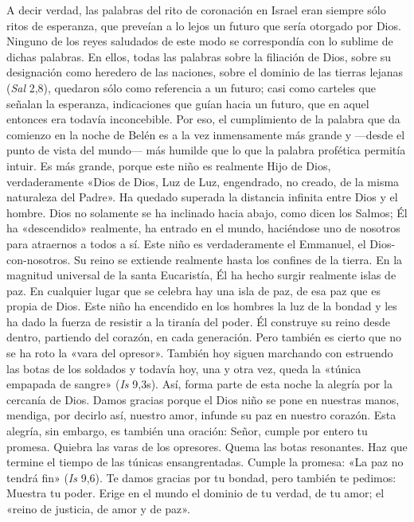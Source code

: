 \documentclass[]{article}
\begin{document}
A decir verdad, las palabras del rito de coronación en Israel eran
siempre sólo ritos de esperanza, que preveían a lo lejos un futuro que
sería otorgado por Dios. Ninguno de los reyes saludados de este modo se
correspondía con lo sublime de dichas palabras. En ellos, todas las
palabras sobre la filiación de Dios, sobre su designación como heredero
de las naciones, sobre el dominio de las tierras lejanas (\emph{Sal}
2,8), quedaron sólo como referencia a un futuro; casi como carteles que
señalan la esperanza, indicaciones que guían hacia un futuro, que en
aquel entonces era todavía inconcebible. Por eso, el cumplimiento de la
palabra que da comienzo en la noche de Belén es a la vez inmensamente
más grande y ---desde el punto de vista del mundo--- más humilde que lo
que la palabra profética permitía intuir. Es más grande, porque este
niño es realmente Hijo de Dios, verdaderamente «Dios de Dios, Luz de
Luz, engendrado, no creado, de la misma naturaleza del Padre». Ha
quedado superada la distancia infinita entre Dios y el hombre. Dios no
solamente se ha inclinado hacia abajo, como dicen los Salmos; Él ha
«descendido» realmente, ha entrado en el mundo, haciéndose uno de
nosotros para atraernos a todos a sí. Este niño es verdaderamente el
Emmanuel, el Dios-con-nosotros. Su reino se extiende realmente hasta los
confines de la tierra. En la magnitud universal de la santa Eucaristía,
Él ha hecho surgir realmente islas de paz. En cualquier lugar que se
celebra hay una isla de paz, de esa paz que es propia de Dios. Este niño
ha encendido en los hombres la luz de la bondad y les ha dado la fuerza
de resistir a la tiranía del poder. Él construye su reino desde dentro,
partiendo del corazón, en cada generación. Pero también es cierto que no
se ha roto la «vara del opresor». También hoy siguen marchando con
estruendo las botas de los soldados y todavía hoy, una y otra vez, queda
la «túnica empapada de sangre» (\emph{Is} 9,3s). Así, forma parte de
esta noche la alegría por la cercanía de Dios. Damos gracias porque el
Dios niño se pone en nuestras manos, mendiga, por decirlo así, nuestro
amor, infunde su paz en nuestro corazón. Esta alegría, sin embargo, es
también una oración: Señor, cumple por entero tu promesa. Quiebra las
varas de los opresores. Quema las botas resonantes. Haz que termine el
tiempo de las túnicas ensangrentadas. Cumple la promesa: «La paz no
tendrá fin» (\emph{Is} 9,6). Te damos gracias por tu bondad, pero
también te pedimos: Muestra tu poder. Erige en el mundo el dominio de tu
verdad, de tu amor; el «reino de justicia, de amor y de paz».
\end{document}
